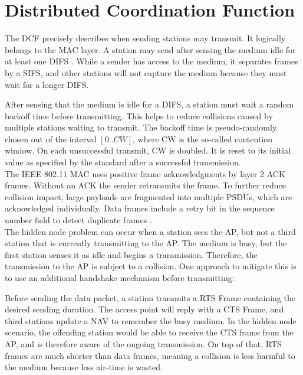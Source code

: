 
\section{Distributed Coordination Function}\label{sec:dcf}

The \gls{DCF} precisely describes when sending stations may transmit. It logically belongs to the \gls{MAC} layer. A station may send after sensing the medium idle for at least one \gls{DIFS} \cite{bianchi2000}. While a sender has access to the medium, it separates frames by a \gls{SIFS}, and other stations will not capture the medium because they must wait for a longer \gls{DIFS}.

After sensing that the medium is idle for a \gls{DIFS}, a station must wait a random backoff time before transmitting. This helps to reduce collisions caused by multiple stations waiting to transmit. The backoff time is pseudo-randomly chosen out of the interval $[0..CW]$, where CW is the so-called contention window. On each unsuccessful transmit, CW is doubled. It is reset to its initial value as specified by the standard after a successful transmission.\\

The \gls{IEEE} 802.11 \gls{MAC} uses positive frame acknowledgments by layer 2 \gls{ACK} frames. Without an \gls{ACK} the sender retransmits the frame. To further reduce collision impact, large payloads are fragmented into multiple \glspl{PSDU}, which are acknowledged individually. Data frames include a retry bit in the sequence number field to detect duplicate frames \cite{perahia2013}.\\

The hidden node problem can occur when a station sees the \gls{AP}, but not a third station that is currently transmitting to the \gls{AP}. The medium is busy, but the first station senses it as idle and begins a transmission. Therefore, the transmission to the \gls{AP} is subject to a collision. One approach to mitigate this is to use an additional handshake mechanism before transmitting:

Before sending the data packet, a station transmits a \gls{RTS} Frame containing the desired sending duration. The access point will reply with a \gls{CTS} Frame, and third stations update a \gls{NAV} to remember the busy medium. In the hidden node scenario, the offending station would be able to receive the \gls{CTS} frame from the \gls{AP}, and is therefore aware of the ongoing transmission. On top of that, \gls{RTS} frames are much shorter than data frames, meaning a collision is less harmful to the medium because less air-time is wasted.


